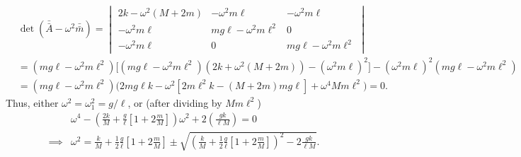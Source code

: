 \documentclass{article}
\begin{document}
        \begin{align*} 
            & \det(\bar {\bar A} - \omega^2\bar {\bar m}) = 
            \begin{vmatrix}
                2k - \omega^2(M + 2m) & -\omega^2m\ell & - \omega^2m \ell \\
                -\omega^2m\ell & mg\ell - \omega^2m\ell^2 & 0 \\
                -\omega^2m\ell & 0 & mg\ell - \omega^2m\ell^2
            \end{vmatrix}
            \\
            & = (mg\ell - \omega^2m\ell^2) \Big[(mg\ell - \omega^2m\ell^2)(2k + \omega^2(M + 2m)) - (\omega^2m \ell)^2\Big] 
            - (\omega^2m\ell)^2 \left(mg\ell - \omega^2m\ell^2\right) \\ 
            & = (mg\ell - \omega^2m\ell^2) \bigg(2mg\ell k  - \omega^2[2m\ell^2k - (M + 2m)mg\ell] + \omega^4Mm\ell^2 \bigg) = 0.
        \end{align*}
        Thus, either $\omega^2 = \omega_1^2 = g/\ell$, or (after dividing by $Mm\ell^2$)
        \begin{align*}
            & \omega^4 - \left(\frac{2k}{M} + \frac{g}{\ell}\left[1 + 2 \frac{m}{M}\right]\right) \omega^2 + 2\left(\frac{gk}{\ell M}\right) = 0\\
            \implies  &\omega^2 = \frac{k}{M} + \frac{1}{2}\frac{g}{\ell}\left[1 + 2 \frac{m}{M}\right]\pm \sqrt{\left(\frac{k}{M} + \frac{1}{2}\frac{g}{\ell}\left[1 + 2 \frac{m}{M}\right]\right)^2 - 2 \frac{gk}{\ell M}}.
        \end{align*}
\end{document}
